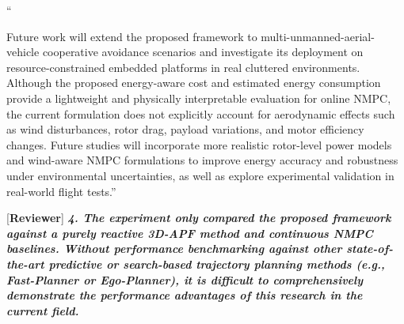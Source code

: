 \documentclass[12pt, twosides]{article}
\theoremstyle{definition}
\begin{document}
``{Future work will extend the proposed framework to multi-unmanned-aerial-vehicle cooperative avoidance scenarios and investigate its deployment on resource-constrained embedded platforms in real cluttered environments. Although the proposed energy-aware cost and estimated energy consumption provide a lightweight and physically interpretable evaluation for online NMPC, the current formulation does not explicitly account for aerodynamic effects such as wind disturbances, rotor drag, payload variations, and motor efficiency changes. Future studies will incorporate more realistic rotor-level power models and wind-aware NMPC formulations to improve energy accuracy and robustness under environmental uncertainties, as well as explore experimental validation in real-world flight tests.''

\begin{table}[t]
	\captionsetup{labelformat=empty}
	\caption{\textcolor{blue}{Table III: Quantitative Performance Comparison of Different Algorithms in a Complex Dynamic Urban Scenario}}
	\label{tab:baseline_comparison}
	\centering
	\renewcommand{\arraystretch}{1.15}
	\setlength{\tabcolsep}{2pt}
	\footnotesize
\end{table}

\textcolor[rgb]{0.00,0.00,1.00}{[\textbf {Reviewer}]} \textit{\textbf{4. The experiment only compared the proposed framework against a purely reactive 3D-APF method and continuous NMPC baselines. Without performance benchmarking against other state-of-the-art predictive or search-based trajectory planning methods (e.g., Fast-Planner or Ego-Planner), it is difficult to comprehensively demonstrate the performance advantages of this research in the current field.}}

}
\end{document}
